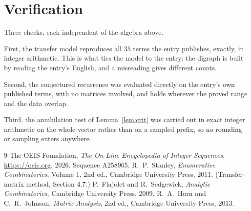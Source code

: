 \documentclass[11pt,a4paper]{article}
\theoremstyle{plain}
\theoremstyle{definition}
\begin{document}
\section{Verification}

Three checks, each independent of the algebra above.

First, the transfer model reproduces all $35$ terms the entry publishes, exactly, in
integer arithmetic. This is what ties the model to the entry: the digraph is built by reading
the entry's English, and a misreading gives different counts.

Second, the conjectured recurrence was evaluated directly on the entry's own published terms,
with no matrices involved, and holds wherever the proved range and the data overlap.

Third, the annihilation test of Lemma~\ref{lem:crit} was carried out in exact integer
arithmetic on the whole vector rather than on a sampled prefix, so no rounding or sampling
enters anywhere.

\begin{thebibliography}{9}
 The OEIS Foundation, \emph{The On-Line Encyclopedia of Integer
Sequences}, \url{https://oeis.org}, 2026. Sequence A258965.
 R.~P.~Stanley, \emph{Enumerative Combinatorics}, Volume 1, 2nd ed.,
Cambridge University Press, 2011. (Transfer-matrix method, Section 4.7.)
 P.~Flajolet and R.~Sedgewick, \emph{Analytic Combinatorics}, Cambridge
University Press, 2009.
 R.~A.~Horn and C.~R.~Johnson, \emph{Matrix Analysis}, 2nd ed., Cambridge
University Press, 2013.
\end{thebibliography}
\end{document}
